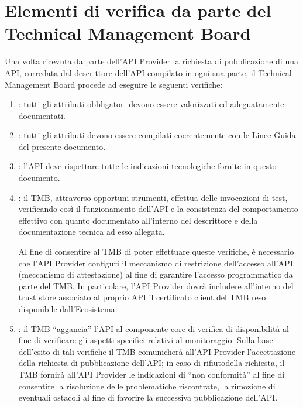 \documentclass[letterpaper,10pt,italian]{sphinxmanual}
\begin{document}
\section{Elementi di verifica da parte del Technical Management Board}
\label{\detokenize{verificheTMB:sezione31}}\label{\detokenize{verificheTMB:elementi-di-verifica-da-parte-del-technical-management-board}}
Una volta ricevuta da parte dell’API Provider la richiesta di pubblicazione di una API, corredata dal descrittore dell’API compilato in ogni sua parte, il Technical Management Board procede ad eseguire le seguenti verifiche:
\begin{enumerate}
\item {} 
: tutti gli attributi obbligatori devono essere valorizzati ed adeguatamente documentati.

\item {} 
: tutti gli attributi devono essere compilati coerentemente con le Linee Guida del presente documento.

\item {} 
: l’API deve rispettare tutte le indicazioni tecnologiche fornite in questo documento.

\item {} 
: il TMB, attraverso opportuni strumenti, effettua delle invocazioni di test, verificando così il funzionamento dell’API e la consistenza del comportamento effettivo con quanto documentato all’interno del descrittore e della documentazione tecnica ad esso allegata. %
\begin{footnote}[1]\sphinxAtStartFootnote
Al fine di consentire al TMB di poter effettuare queste verifiche, è necessario che l’API Provider configuri il meccanismo di restrizione dell’accesso all’API (meccanismo di attestazione) al fine di garantire l’accesso programmatico da parte del TMB. In particolare, l’API Provider dovrà includere all’interno del trust store associato al proprio API il certificato client del TMB reso disponibile dall’Ecosistema.
%
\end{footnote}

\item {} 
: il TMB “aggancia” l’API al componente core di verifica di disponibilità al fine di verificare gli aspetti specifici relativi al monitoraggio. Sulla base dell’esito di tali verifiche il TMB comunicherà all’API Provider l’accettazione della richiesta di pubblicazione dell’API; in caso di rifiutodella richiesta, il TMB fornirà all’API Provider le indicazioni di “non conformità” al fine di consentire la risoluzione delle problematiche riscontrate, la rimozione di eventuali ostacoli al fine di favorire la successiva pubblicazione dell’API.

\end{enumerate}
\end{document}
